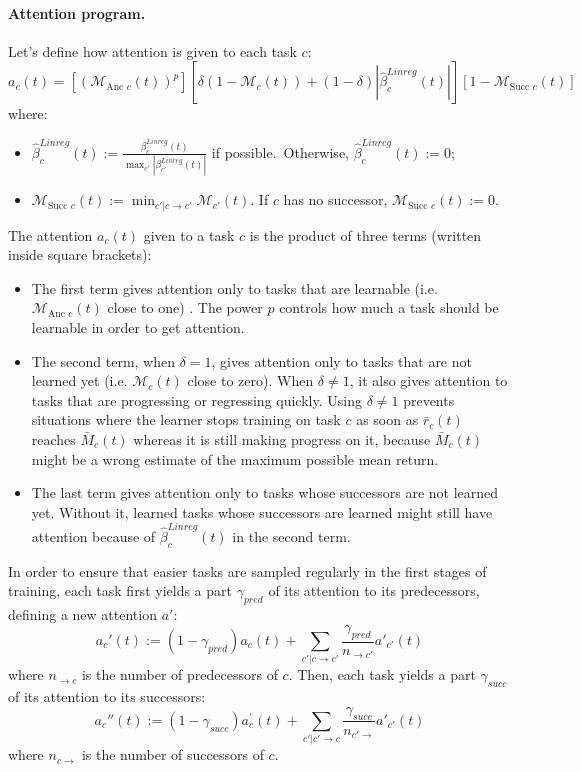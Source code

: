 \documentclass{article}
\begin{document}
\paragraph{Attention program.} Let's define how attention is given to each task $c$:
\begin{equation}
\label{eq:mr-attention}
a_c(t) =\left[\left(\mathcal{M}_{\text{Anc }c}(t)\right)^p\right]\left[\delta(1-\mathcal{M}_{c}(t)) + (1-\delta)|\hat{\beta}^{Linreg}_c(t)| \right]\left[1-\mathcal{M}_{\text{Succ } c}(t)\right]
\end{equation}
where:
\begin{itemize}
\item \(\hat{\beta}^{Linreg}_c(t):= \frac{\beta^{Linreg}_c(t)}{\max_{c'}|\beta^{Linreg}_{c'}(t)|}\) if possible.\  Otherwise, \(\hat{\beta}^{Linreg}_c(t):=0\);
\item
\(\mathcal{M}_{\text{Succ }c}(t):= \min_{c'|c\rightarrow c'} \mathcal{M}_{c'}(t)\). If \(c\) has no successor, \(\mathcal{M}_{\text{Succ }c}(t):=0\).
\end{itemize}

The attention \(a_c(t)\) given to a task \(c\) is the product of three terms (written inside square brackets):
\begin{itemize}
\item The first term gives attention only to tasks that are learnable (i.e. $\mathcal{M}_{\text{Anc }c}(t)$ close to one) . The power \(p\) controls how much a task should be learnable in order to get attention.
\item The second term,  when \(\delta=1\), gives attention only to tasks that are not learned yet (i.e. $\mathcal{M}_{c}(t)$ close to zero).
When \(\delta \neq 1\), it also gives attention to tasks that are progressing or regressing quickly. Using \(\delta \neq 1\) prevents situations where the learner stops training on task $c$ as soon as $\bar{r}_c(t)$ reaches $\bar{M}_c(t)$ whereas it is still making progress on it, because $\bar{M}_c(t)$ might be a wrong estimate of the maximum possible mean return.
\item The last term gives attention only to tasks whose successors are not learned yet. Without it, learned tasks whose successors are learned might still have attention because of \(\hat{\beta}^{Linreg}_c(t)\) in the second term.
\end{itemize}
In order to ensure that easier tasks are sampled regularly in the first stages of training, each task first yields a part \(\gamma_{pred}\) of its attention to its predecessors, defining a new attention $a'$:
\begin{equation}\label{eq:MR-pred-rd}
a_c'(t) := (1-\gamma_{pred})a_c(t)+\sum_{c' | c\rightarrow c'} \frac{\gamma_{pred}}{n_{\rightarrow c'}}a'_{c'}(t)
\end{equation}
where \(n_{\rightarrow c}\) is the number of predecessors of $c$. Then, each task yields a part \(\gamma_{succ}\) of its attention to its successors:
\begin{equation}\label{eq:MR-succ-rd}
a_c{''}(t) := (1-\gamma_{succ})a^{'}_c(t)+\sum_{c' | c'\rightarrow c} \frac{\gamma_{succ}}{n_{c'\rightarrow}}a'_{c'}(t)
\end{equation}
where \(n_{c\rightarrow}\) is the number of successors of $c$.
\end{document}
